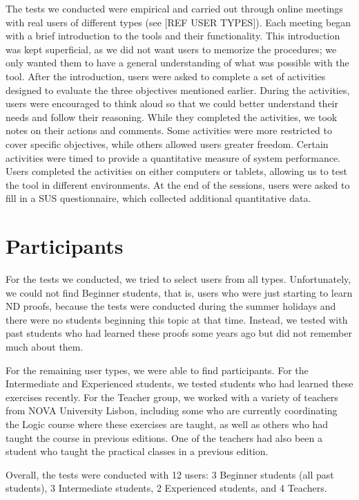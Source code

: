 The tests we conducted were empirical and carried out through online meetings with real users of different types (see [REF USER TYPES]). Each meeting began with a brief introduction to the tools and their functionality. This introduction was kept superficial, as we did not want users to memorize the procedures; we only wanted them to have a general understanding of what was possible with the tool. After the introduction, users were asked to complete a set of activities designed to evaluate the three objectives mentioned earlier. During the activities, users were encouraged to think aloud so that we could better understand their needs and follow their reasoning. While they completed the activities, we took notes on their actions and comments. Some activities were more restricted to cover specific objectives, while others allowed users greater freedom. Certain activities were timed to provide a quantitative measure of system performance. Users completed the activities on either computers or tablets, allowing us to test the tool in different environments. At the end of the sessions, users were asked to fill in a SUS questionnaire, which collected additional quantitative data.

\section{Participants}
For the tests we conducted, we tried to select users from all types. Unfortunately, we could not find Beginner students, that is, users who were just starting to learn \gls{ND} proofs, because the tests were conducted during the summer holidays and there were no students beginning this topic at that time. Instead, we tested with past students who had learned these proofs some years ago but did not remember much about them.

For the remaining user types, we were able to find participants. For the Intermediate and Experienced students, we tested students who had learned these exercises recently. For the Teacher group, we worked with a variety of teachers from NOVA University Lisbon, including some who are currently coordinating the Logic course where these exercises are taught, as well as others who had taught the course in previous editions. One of the teachers had also been a student who taught the practical classes in a previous edition.

Overall, the tests were conducted with 12 users: 3 Beginner students (all past students), 3 Intermediate students, 2 Experienced students, and 4 Teachers.

